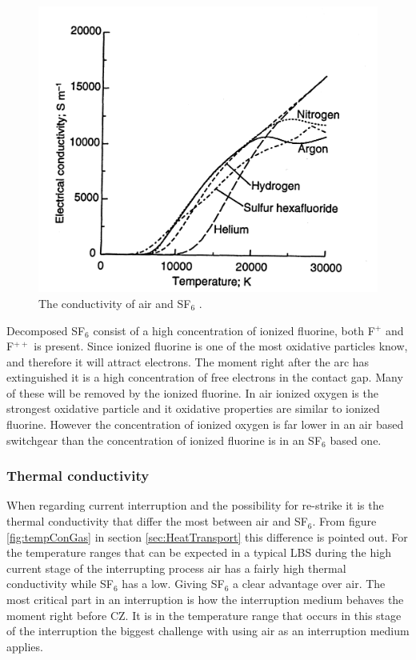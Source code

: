 \documentclass[10pt,a4paper]{article} %
\begin{document}
\begin{figure}[H]
\centering
\includegraphics[scale=1]{Bilder/Discussion/conductSF6AndAIR.png}
\caption{The conductivity of air and SF${_6}$ \cite{bib:THFD}.} \label{fig:AirandSF6ConComp}
\end{figure}

Decomposed SF${_6}$ consist of a high concentration of ionized fluorine, both F$^+$ and F$^{++}$ is present. Since ionized fluorine is one of the most oxidative particles know, and therefore it will attract electrons. The moment right after the arc has extinguished it is a high concentration of free electrons in the contact gap. Many of these will be removed by the ionized fluorine. In air ionized oxygen is the strongest oxidative particle and it oxidative properties are similar to ionized fluorine. However the concentration of ionized oxygen is far lower in an air based switchgear than the concentration of ionized fluorine is in an SF$_6$ based one.

\subsubsection*{Thermal conductivity}
When regarding current interruption and the possibility for re-strike it is the thermal conductivity that differ the most between air and SF$_{6}$. From figure \ref{fig:tempConGas} in section \ref{sec:HeatTransport} this difference is pointed out. For the temperature ranges that can be expected in a typical LBS during the high current stage of the interrupting process air has a fairly high thermal conductivity while SF$_6$ has a low. Giving SF$_6$ a clear advantage over air. The most critical part in an interruption is how the interruption medium behaves the moment right before CZ. It is in the temperature range that occurs in this stage of the interruption the biggest challenge with using air as an interruption medium applies.
\end{document}
